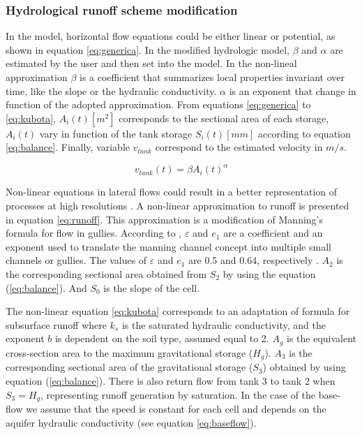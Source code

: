\documentclass[hess, manuscript]{copernicus}
\begin{document}
\subsubsection{Hydrological runoff scheme modification}

In the model, horizontal flow equations could be either linear or potential, as shown in equation \ref{eq:generica}. In the modified hydrologic model, $\beta$ and $\alpha$ are estimated by the user and then set into the model. In the non-lineal approximation $\beta$ is a coefficient that summarizes local properties invariant over time, like the slope or the hydraulic conductivity. $\alpha$ is an exponent that change in function of the adopted approximation. From equations \ref{eq:generica} to \ref{eq:kubota}, $A_i(t) [m^2]$ corresponds to the sectional area of each storage, $A_i(t)$ vary in function of the tank storage $S_i(t) [mm]$ according to equation \ref{eq:balance}. Finally, variable $v_{tank}$ correspond to the estimated velocity in $m/s$.

\begin{equation}
 v_{tank}(t) = \beta A_i(t) ^{\alpha} 
    \label{eq:generica}
\end{equation}

Non-linear equations in lateral flows could result in a better representation of processes at high resolutions \citep{Beven1981, Kirkby1967}.  A non-linear approximation to runoff is presented in equation \ref{eq:runoff}.   This approximation is a modification of Manning's formula for flow in gullies. According to \citet{Foster1984}, $\varepsilon$ and $e_1$ are a coefficient and an exponent used to translate the manning channel concept into multiple small channels or gullies. The values of $\varepsilon$ and $e_1$ are 0.5 and 0.64, respectively \citep{Foster1984}. $A_2$ is the corresponding sectional area obtained from $S_2$ by using the equation (\ref{eq:balance}). And $S_0$ is the slope of the cell.    

The non-linear equation \ref{eq:kubota} corresponds to an adaptation of \citet{Kubota1995} formula for subsurface runoff where $k_s$ is the saturated hydraulic conductivity, and the exponent $b$ is dependent on the soil type, assumed equal to 2.  $A_g$ is the equivalent cross-section area to the maximum gravitational storage ($H_g$).  $A_3$ is the corresponding sectional area of the gravitational storage ($S_3$) obtained by using equation (\ref{eq:balance}).  There is also return flow from tank 3 to tank 2 when $S_3=H_g$, representing runoff generation by saturation.  In the case of the base-flow we assume that the speed is constant for each cell and depends on the aquifer hydraulic conductivity (see equation \ref{eq:baseflow}).
\end{document}
